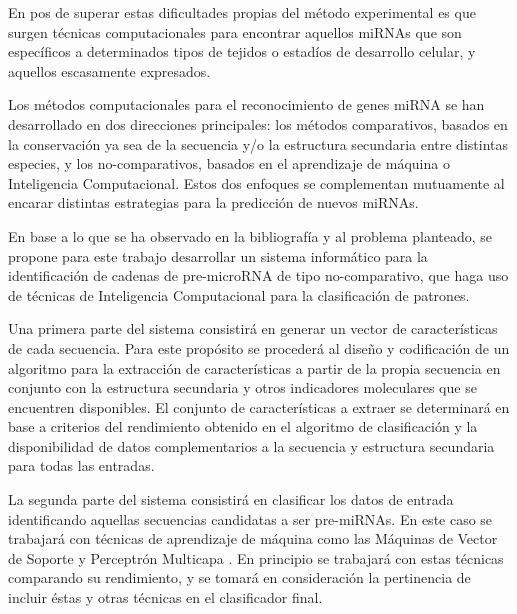 \documentclass[12pt,bibliography=oldstyle,DIV=12,parskip=full-]{scrartcl}
\begin{document}
En pos de superar estas dificultades propias del método experimental
es que surgen técnicas computacionales para encontrar aquellos miRNAs
que son específicos a determinados tipos de tejidos o estadíos de
desarrollo celular, y aquellos escasamente
expresados. \cite{sheng}\cite{xu}

Los métodos computacionales para el reconocimiento de genes miRNA se
han desarrollado en dos direcciones principales: los métodos
comparativos, basados en la conservación ya sea de la secuencia y/o la
estructura secundaria entre distintas especies, y los no-comparativos,
basados en el aprendizaje de máquina o Inteligencia
Computacional. Estos dos enfoques se complementan mutuamente al
encarar distintas estrategias para la predicción de nuevos
miRNAs. \cite{batuwita}\cite{sheng}

En base a lo que se ha observado en la bibliografía y al problema
planteado, se propone para este trabajo desarrollar un sistema
informático para la identificación de cadenas de pre-microRNA de tipo
no-comparativo, que haga uso de técnicas de Inteligencia Computacional
para la clasificación de patrones.

Una primera parte del sistema consistirá en generar un vector de
características de cada secuencia. Para este propósito se procederá al
diseño y codificación de un algoritmo para la extracción de
características a partir de la propia secuencia en conjunto con la
estructura secundaria y otros indicadores moleculares que se
encuentren disponibles. El conjunto de características a extraer se
determinará en base a criterios del rendimiento obtenido en el
algoritmo de clasificación y la disponibilidad de datos
complementarios a la secuencia y estructura secundaria para todas las
entradas.

La segunda parte del sistema consistirá en clasificar los datos de
entrada identificando aquellas secuencias candidatas a ser
pre-miRNAs. En este caso se trabajará con técnicas de aprendizaje de
máquina como las Máquinas de Vector de Soporte \cite{svm} y Perceptrón
Multicapa \cite{mlp1}\cite{mlp2}. En principio se trabajará con estas
técnicas comparando su rendimiento, y se tomará en consideración la
pertinencia de incluir éstas y otras técnicas en el clasificador
final.
\end{document}
